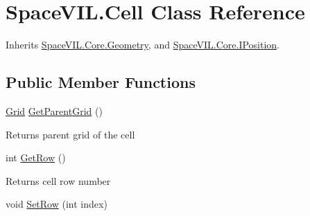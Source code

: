 \hypertarget{class_space_v_i_l_1_1_cell}{}\section{Space\+V\+I\+L.\+Cell Class Reference}
\label{class_space_v_i_l_1_1_cell}


Inherits \mbox{\hyperlink{class_space_v_i_l_1_1_core_1_1_geometry}{Space\+V\+I\+L.\+Core.\+Geometry}}, and \mbox{\hyperlink{interface_space_v_i_l_1_1_core_1_1_i_position}{Space\+V\+I\+L.\+Core.\+I\+Position}}.

\subsection*{Public Member Functions}
\begin{DoxyCompactItemize}
\item 
\mbox{\label{class_space_v_i_l_1_1_cell_ab4b459e1749d33d8e9d7498437bb3621}} 
\mbox{\hyperlink{class_space_v_i_l_1_1_grid}{Grid}} \mbox{\hyperlink{class_space_v_i_l_1_1_cell_ab4b459e1749d33d8e9d7498437bb3621}{Get\+Parent\+Grid}} ()
\begin{DoxyCompactList}\small\item\em \begin{DoxyReturn}{Returns}
parent grid of the cell 
\end{DoxyReturn}
\end{DoxyCompactList}\item 
\mbox{\label{class_space_v_i_l_1_1_cell_a3f66c9f38e3c8bc2c5bbb0d2997591f5}} 
int \mbox{\hyperlink{class_space_v_i_l_1_1_cell_a3f66c9f38e3c8bc2c5bbb0d2997591f5}{Get\+Row}} ()
\begin{DoxyCompactList}\small\item\em \begin{DoxyReturn}{Returns}
cell row number 
\end{DoxyReturn}
\end{DoxyCompactList}\item 
\mbox{\label{class_space_v_i_l_1_1_cell_afe9e40389b0ba88d38eceb1fd2059ee7}} 
void \mbox{\hyperlink{class_space_v_i_l_1_1_cell_afe9e40389b0ba88d38eceb1fd2059ee7}{Set\+Row}} (int index)
\begin{DoxyCompactList}\small\item\em 

\end{DoxyCompactList}
\end{DoxyCompactItemize}
